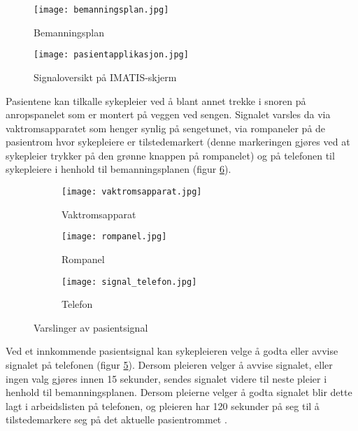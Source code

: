 \begin{figure}[H]
\centering
\texttt{[image: bemanningsplan.jpg]}
\caption{Bemanningsplan}
\label{IMATISbemanningsplan}
\end{figure}

\begin{figure}[H]
\centering
\texttt{[image: pasientapplikasjon.jpg]}
\caption{Signaloversikt på IMATIS-skjerm}
\label{IMATISpasientapplikasjon}
\end{figure}

\noindent
Pasientene kan tilkalle sykepleier ved å blant annet trekke i snoren på anropspanelet som er montert på veggen ved sengen. Signalet varsles da via vaktromsapparatet som henger synlig på sengetunet, via rompaneler på de pasientrom hvor sykepleiere er tilstedemarkert (denne markeringen gjøres ved at sykepleier trykker på den grønne knappen på rompanelet) og på telefonen til sykepleiere i henhold til bemanningsplanen (figur \ref{varslinger}). 

\begin{figure}[H]
        \centering
         \begin{subfigure}[b]{0.3\textwidth}
        		\centering
                \texttt{[image: vaktromsapparat.jpg]}
                \caption{Vaktromsapparat}
                \label{rompanel}
        \end{subfigure}
        \begin{subfigure}[b]{0.3\textwidth}
        		\centering
                \texttt{[image: rompanel.jpg]}
                \caption{Rompanel}
                \label{rompanel}
        \end{subfigure}
          \begin{subfigure}[b]{0.3\textwidth}
        		\centering
                \texttt{[image: signal\_telefon.jpg]}
                \caption{Telefon}
                \label{signal_telefon}
        \end{subfigure}      
        \caption{Varslinger av pasientsignal}
        \label{varslinger}
\end{figure}

\noindent
Ved et innkommende pasientsignal kan sykepleieren velge å godta eller avvise signalet på telefonen (figur \ref{signal_telefon}). Dersom pleieren velger å avvise signalet, eller ingen valg gjøres innen 15 sekunder, sendes signalet videre til neste pleier i henhold til bemanningsplanen. Dersom pleierne velger å godta signalet blir dette lagt i arbeidslisten på telefonen, og pleieren har 120 sekunder på seg til å tilstedemarkere seg på det aktuelle pasientrommet \citep{BrukermanualforPasientsignalogPasientsignalapplikasjon}. 

